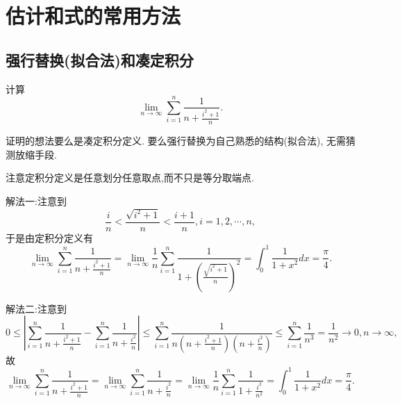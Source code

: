 \documentclass[lang=cn,newtx,10pt,scheme=chinese]{elegantbook}
\begin{document}
\section{估计和式的常用方法}

\subsection{强行替换(拟合法)和凑定积分}\label{强行替换(拟合法)和凑定积分}

\begin{example}
计算
\[
\lim_{n\rightarrow\infty}\sum_{i = 1}^{n}\frac{1}{n+\frac{i^{2}+1}{n}}.
\]
\end{example}
\begin{note}
证明的想法要么是凑定积分定义. 要么强行替换为自己熟悉的结构(拟合法), 无需猜测放缩手段.
\end{note}
\begin{remark}
注意定积分定义是任意划分任意取点,而不只是等分取端点.
\end{remark}
\begin{solution}
{\color{blue}解法一:}注意到
\[
\frac{i}{n}<\frac{\sqrt{i^{2}+1}}{n}<\frac{i + 1}{n},i = 1,2,\cdots,n,
\]
于是由定积分定义有
\[
\lim_{n\rightarrow\infty}\sum_{i = 1}^{n}\frac{1}{n+\frac{i^{2}+1}{n}}=\lim_{n\rightarrow\infty}\frac{1}{n}\sum_{i = 1}^{n}\frac{1}{1+\left(\frac{\sqrt{i^{2}+1}}{n}\right)^{2}}=\int_{0}^{1}\frac{1}{1 + x^{2}}dx=\frac{\pi}{4}.
\]

{\color{blue}解法二:}注意到
\[
0\leq\left|\sum_{i = 1}^{n}\frac{1}{n+\frac{i^{2}+1}{n}}-\sum_{i = 1}^{n}\frac{1}{n+\frac{i^{2}}{n}}\right|\leqslant\sum_{i = 1}^{n}\frac{1}{n\left(n+\frac{i^{2}+1}{n}\right)\left(n+\frac{i^{2}}{n}\right)}\leqslant\sum_{i = 1}^{n}\frac{1}{n^{3}}=\frac{1}{n^{2}}\rightarrow0,n\rightarrow\infty,
\]
故
\[
\lim_{n\rightarrow\infty}\sum_{i = 1}^{n}\frac{1}{n+\frac{i^{2}+1}{n}}=\lim_{n\rightarrow\infty}\sum_{i = 1}^{n}\frac{1}{n+\frac{i^{2}}{n}}=\lim_{n\rightarrow\infty}\frac{1}{n}\sum_{i = 1}^{n}\frac{1}{1+\frac{i^{2}}{n^{2}}}=\int_{0}^{1}\frac{1}{1 + x^{2}}dx=\frac{\pi}{4}.
\]
\end{solution}
\end{document}
